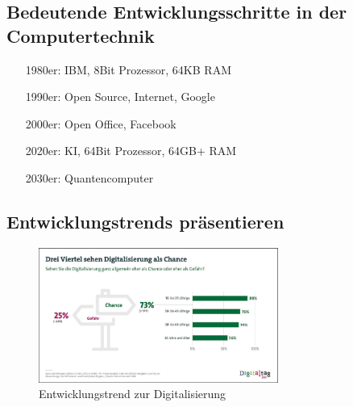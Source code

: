 \documentclass[11pt]{article}
\begin{document}
\subsection{Bedeutende Entwicklungsschritte in der Computertechnik}
    \vspace{0.5em}
    \begin{itemize}[leftmargin=3cm]
        \item[1980er:] IBM, 8Bit Prozessor, 64KB RAM
        \item[1990er:] Open Source, Internet, Google
        \item[2000er:] Open Office, Facebook
        \item[2020er:] KI, 64Bit Prozessor, 64GB+ RAM
        \item[2030er:] Quantencomputer
    \end{itemize}

\newpage
\subsection{Entwicklungstrends präsentieren}
    \vspace{-0.5em}
    \begin{figure}[h]
        \centering
        \includegraphics[width=0.7\textwidth]{./images/2.1.3_entwicklungstrend-digitalisierung.png}
        \caption{Entwicklungstrend zur Digitalisierung}\label{fig:Entwicklungstrend_Digitalisierung}
    \end{figure}
    \vspace{-0.5em}
\end{document}
